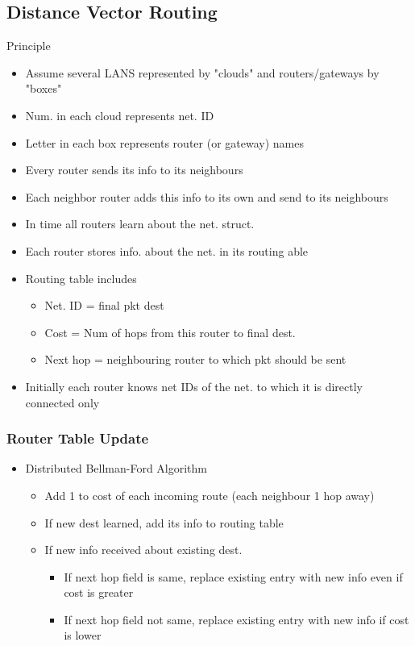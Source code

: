 \documentclass[a4paper]{article}
\begin{document}
\subsection{Distance Vector Routing}
Principle
\begin{itemize}
	\item Assume several LANS represented by "clouds" and routers/gateways
		by "boxes"
	\item Num. in each cloud represents net. ID
	\item Letter in each box represents router (or gateway) names
	\item Every router sends its info to its neighbours
	\item Each neighbor router adds this info to its own and send to its
		neighbours
	\item In time all routers learn about the net. struct.
	\item Each router stores info. about the net. in its routing able
	\item Routing table includes
	\begin{itemize}
		\item Net. ID = final pkt dest
		\item Cost = Num of hops from this router to final dest.
		\item Next hop = neighbouring router to which pkt should be sent
	\end{itemize}
	\item Initially each router knows net IDs of the net. to which it is
		directly connected only
\end{itemize}
\subsubsection{Router Table Update}
\begin{itemize}
	\item Distributed Bellman-Ford Algorithm
	\begin{itemize}
		\item Add 1 to cost of each incoming route (each neighbour 1 hop
			away)
		\item If new dest learned, add its info to routing table
		\item If new info received about existing dest.
		\begin{itemize}
			\item If next hop field is same, replace existing entry
				with new info even if cost is greater
			\item If next hop field not same, replace existing entry
				with new info if cost is lower
		\end{itemize}
	\end{itemize}
\end{itemize}
\end{document}
